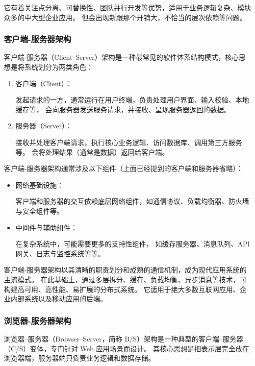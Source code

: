 \documentclass[12pt]{ctexart} %
\begin{document}
它有着关注点分离、可替换性、团队并行开发等优势，适用于业务逻辑复杂、模块众多的中大型企业应用。
但会出现新跟那个开销大，不恰当的层次依赖等问题。

\subsubsection{客户端-服务器架构}
客户端-服务器（Client–Server）架构是一种最常见的软件体系结构模式，核心思想是将系统划分为两类角色：
\begin{enumerate}
  \item 客户端（Client）：

  发起请求的一方，通常运行在用户终端，负责处理用户界面、输入校验、本地缓存等，
  会向服务器发送服务请求，并接收、呈现服务器返回的数据。
  \item 服务器（Server）：
  
  接收并处理客户端请求，执行核心业务逻辑、访问数据库、调用第三方服务等。
  会将处理结果（通常是数据）返回给客户端。
\end{enumerate}

客户端-服务器架构通常涉及以下组件（上面已经提到的客户端和服务器省略）：
\begin{itemize}
  \item 网络基础设施：

  客户端和服务器的交互依赖底层网络组件，如通信协议、负载均衡器、防火墙与安全组件等。
  \item 中间件与辅助组件：
  
  在复杂系统中，可能需要更多的支持性组件，
  如缓存服务器、消息队列、API网关、日志与监控系统等等。
\end{itemize}

客户端‑服务器架构以其清晰的职责划分和成熟的通信机制，成为现代应用系统的主流模式。
在此基础上，通过多层拆分、缓存、负载均衡、异步消息等技术，可构建高可用、高性能、易扩展的分布式系统。
它适用于绝大多数互联网应用、企业内部系统以及移动应用的后端。

\subsubsection{浏览器-服务器架构}
浏览器–服务器（Browser–Server，简称 B/S）架构是一种典型的客户端–服务器（C/S）变体，专门针对 Web 应用场景而设计。
其核心思想是把表示层完全放在浏览器端，服务器端只负责业务逻辑和数据存储。
\end{document}
